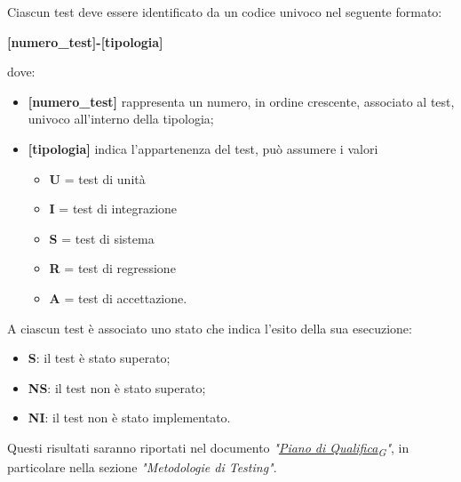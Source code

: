 Ciascun test deve essere identificato da un codice univoco nel seguente formato:
\begin{center}
	\textbf{[numero\_test]-[tipologia]}
\end{center}
dove:
\begin{itemize}
	\item \textbf{[numero\_test]} rappresenta un numero, in ordine crescente, associato al test, univoco all'interno della tipologia;
	\item \textbf{[tipologia]} indica l'appartenenza del test, può assumere i valori
	      \begin{itemize}
		      \item \textbf{U} = test di unità
		      \item \textbf{I} = test di integrazione
		      \item \textbf{S} = test di sistema
		      \item \textbf{R} = test di regressione
		      \item \textbf{A} = test di accettazione.
	      \end{itemize}

\end{itemize}

A ciascun test è associato uno stato che indica l'esito della sua esecuzione:
\begin{itemize}
	\item \textbf{S}: il test è stato superato;
	\item \textbf{NS}: il test non è stato superato;
	\item \textbf{NI}: il test non è stato implementato.
\end{itemize}
Questi risultati saranno riportati nel documento \textit{"\href{https://7last.github.io/docs/rtb/documentazione-interna/glossario\#piano-di-qualifica}{Piano di Qualifica\textsubscript{G}}"}, in particolare nella sezione \textit{"Metodologie di Testing"}.

